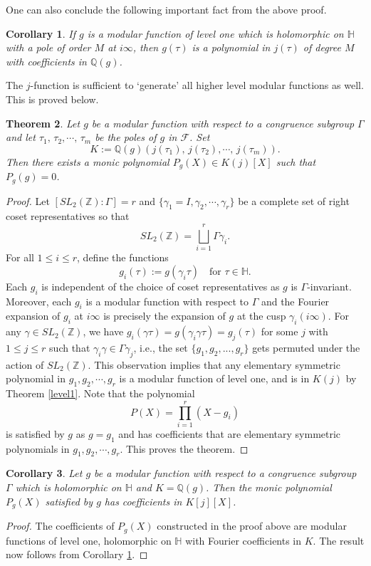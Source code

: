 \documentclass[11pt, reqno]{amsart}
\newtheorem{theorem}{Theorem}[section]
\newtheorem{corollary}[theorem]{Corollary}
\begin{document}
One can also conclude the following important fact from the above proof.
\begin{corollary}\label{rationalfunctions}
If $g$ is a modular function of level one which is holomorphic on $\mathbb{H}$ with a pole of order $M$ at $i\infty$, then $g(\tau)$ is a polynomial in $j(\tau)$ of degree $M$ with coefficients in $\mathbb{Q}(g)$.
\end{corollary}

The $j$-function is sufficient to `generate' all higher level modular functions as well. This is proved below.
\begin{theorem} \label{mdft}
Let $g$ be a modular function with respect to a congruence subgroup $\Gamma$ and let $\tau_1,\, \tau_2, \cdots, \, \tau_m$ be the poles of $g$ in $\mathcal{F}$. Set
$$
K:=\mathbb{Q}(g)\left(j(\tau_1), \, j(\tau_2), \cdots, \, j(\tau_m) \right).
$$
Then there exists a monic polynomial $P_g(X)\in K(j)[X]$ such that $P_g(g)=0$. 
\end{theorem}
\begin{proof}
Let $[S L_2(\mathbb{Z}):\Gamma]=r$ and $\{ \gamma_1=I,\gamma_2,\cdots,\gamma_r\}$ be a complete set of right coset representatives so that $$
S L_2(\mathbb{Z})=\bigsqcup_{i=1}^r\Gamma \gamma_i.
$$
For all $1\leq i \leq r$, define the functions $$g_i(\tau):=g(\gamma_i\tau) \quad \text{for } \tau \in \mathbb{H}.
$$ Each $g_i$ is independent of the choice of coset representatives as $g$ is $\Gamma$-invariant. Moreover, each $g_i$ is a modular function with respect to $\Gamma$ and the Fourier expansion of $g_i$ at $i \infty$ is precisely the expansion of $g$ at the cusp $\gamma_i(i\infty)$. For any $\gamma\in S L_2(\mathbb{Z})$, we have $g_i(\gamma \tau)=g(\gamma_i\gamma\tau)=g_j(\tau)$ for some $j$ with $1 \leq j \leq r$ such that $\gamma_i\gamma\in \Gamma\gamma_j$, i.e., the set $\{g_1,g_2,...,g_r\}$ gets permuted under the action of $S L_2(\mathbb{Z}).$ This observation implies that any elementary symmetric polynomial in $g_1,g_2,\cdots,g_r$ is a modular function of level one, and is in $K(j)$ by Theorem \ref{level1}. Note that the polynomial $$
P(X)=\prod_{i=1}^r(X-g_i)$$is satisfied by $g$ as $g=g_1$ and has coefficients that are elementary symmetric polynomials in $g_1,g_2,\cdots,g_r$. This proves the theorem.
\end{proof}



\begin{corollary}\label{useful}
Let $g$ be a modular function with respect to a congruence subgroup $\Gamma$ which is holomorphic on $\mathbb{H}$ and $K = \mathbb{Q}(g)$. Then the monic polynomial $P_g(X)$ satisfied by $g$ has coefficients in $K[j][X]$.
\end{corollary}
\begin{proof}
The coefficients of $P_g(X)$ constructed in the proof above are modular functions of level one, holomorphic on $\mathbb{H}$ with Fourier coefficients in $K$. The result now follows from Corollary \ref{rationalfunctions}. 
\end{proof}
\end{document}
